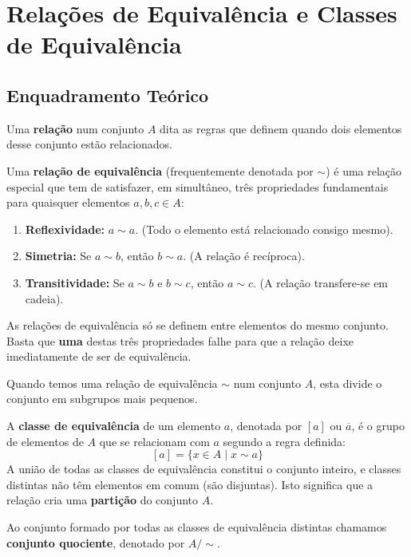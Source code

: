 
\section{Relações de Equivalência e Classes de Equivalência}

\subsection{Enquadramento Teórico}

Uma \textbf{relação} num conjunto $A$ dita as regras que definem quando dois elementos desse conjunto estão relacionados.

\begin{defbox}[title={Relação de Equivalência}]
  Uma \textbf{relação de equivalência} (frequentemente denotada por $\sim$) é uma relação especial que tem de satisfazer, em simultâneo, três propriedades fundamentais para quaisquer elementos $a, b, c \in A$:
  \begin{enumerate}
      \item \textbf{Reflexividade:} $a \sim a$. (Todo o elemento está relacionado consigo mesmo).
      \item \textbf{Simetria:} Se $a \sim b$, então $b \sim a$. (A relação é recíproca).
      \item \textbf{Transitividade:} Se $a \sim b$ e $b \sim c$, então $a \sim c$. (A relação transfere-se em cadeia).
  \end{enumerate}
\end{defbox}

\begin{warnbox}[title={Nota Importante}]
  As relações de equivalência só se definem entre elementos do mesmo conjunto. Basta que \textbf{uma} destas três propriedades falhe para que a relação deixe imediatamente de ser de equivalência.
\end{warnbox}

Quando temos uma relação de equivalência $\sim$ num conjunto $A$, esta divide o conjunto em subgrupos mais pequenos.

\begin{defbox}[title={Classes de Equivalência e Conjunto Quociente}]
  A \textbf{classe de equivalência} de um elemento $a$, denotada por $[a]$ ou $\overline{a}$, é o grupo de elementos de $A$ que se relacionam com $a$ segundo a regra definida:
  \[
      [a] = \{ x \in A \mid x \sim a \}
  \]
  A união de todas as classes de equivalência constitui o conjunto inteiro, e classes distintas não têm elementos em comum (são disjuntas). Isto significa que a relação cria uma \textbf{partição} do conjunto $A$. 
  
  Ao conjunto formado por todas as classes de equivalência distintas chamamos \textbf{conjunto quociente}, denotado por $A/\sim$.
\end{defbox}

